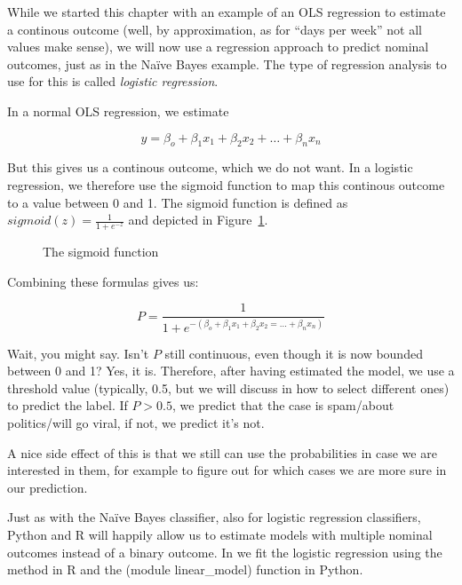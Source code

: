 While we started this chapter with an example of an OLS regression to
estimate a continous outcome (well, by approximation, as for ``days
per week'' not all values make sense), we will now use a regression
approach to predict nominal outcomes, just as in the Na\"ive Bayes
example.  The type of regression analysis to use for this is called
\emph{logistic regression}.

In a normal OLS regression, we estimate

$$y = \beta_o + \beta_1 x_1 + \beta_2 x_2 + \ldots + \beta_n x_n$$

But this gives us a continous outcome, which we do not want. In a
logistic regression, we therefore use the sigmoid function to map this
continous outcome to a value between 0 and 1. The sigmoid function is
defined as $sigmoid(z) = \frac{1}{1 + e^{-z}}$ and depicted in
Figure~\ref{fig:sigmoid}.

\begin{figure}
  \centering
{}
\caption{\label{fig:sigmoid} The sigmoid function}
\end{figure}


Combining these formulas gives us:

$$P = \frac{1}{1 + e^{-(\beta_o + \beta_1 x_1 + \beta_2 x_2 = \ldots + \beta_n x_n)}} $$


Wait, you might say. Isn't $P$ still continuous, even though it is now
bounded between 0 and 1? Yes, it is.  Therefore, after having
estimated the model, we use a threshold value (typically, 0.5, but we will discuss in  how to select different ones) to
predict the label. If $P>0.5$, we predict that the case is spam/about
politics/will go viral, if not, we predict it's not.

A nice side effect of this is that we still can use the probabilities
in case we are interested in them, for example to figure out for which
cases we are more sure in our prediction.

Just as with the Na\"ive Bayes classifier, also for logistic
regression classifiers, Python and R will happily allow us to estimate
models with multiple nominal outcomes instead of a binary outcome. In  we fit the logistic regression using the  method  in R and the  (module linear\_model) function  in Python.

